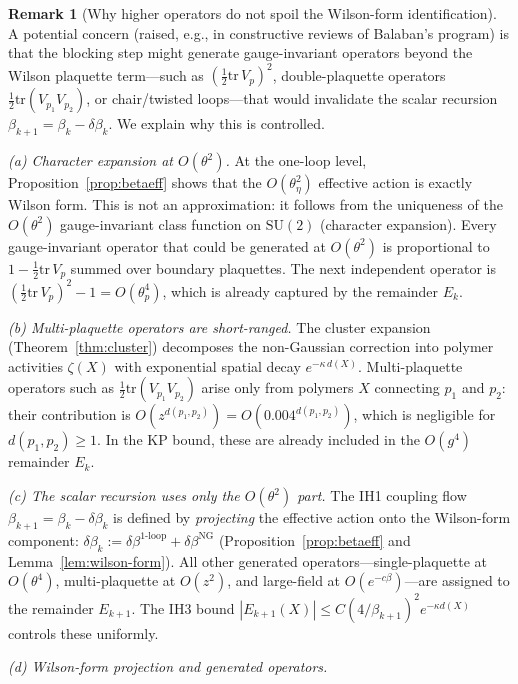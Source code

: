 \documentclass[11pt]{article}
\theoremstyle{definition}
\newtheorem{remark}[theorem]{Remark}
\newcommand{\SU}{\mathrm{SU}}
\newcommand{\tr}{\mathrm{tr}}
\begin{document}
\begin{remark}[Why higher operators do not spoil the Wilson-form identification]%
\label{rem:operator-classification}
A potential concern (raised, e.g., in constructive reviews of
Balaban's program) is that the blocking step might generate
gauge-invariant operators beyond the Wilson plaquette term---such as
$(\frac{1}{2}\tr\,V_p)^2$, double-plaquette operators
$\frac{1}{2}\tr(V_{p_1}V_{p_2})$, or chair/twisted loops---that would
invalidate the scalar recursion $\beta_{k+1}=\beta_k-\delta\beta_k$.
We explain why this is controlled.

\emph{(a) Character expansion at $O(\theta^2)$.}
At the one-loop level, Proposition~\ref{prop:betaeff} shows that
the $O(\theta_\eta^2)$ effective action is exactly Wilson
form.  This is not an approximation: it follows from the uniqueness
of the $O(\theta^2)$ gauge-invariant class function on $\SU(2)$
(character expansion).  Every gauge-invariant operator that could be
generated at $O(\theta^2)$ is proportional to $1-\frac{1}{2}\tr\,V_p$
summed over boundary plaquettes.  The next independent operator
is $(\frac{1}{2}\tr\,V_p)^2-1=O(\theta_p^4)$, which is already
captured by the remainder $E_k$.

\emph{(b) Multi-plaquette operators are short-ranged.}
The cluster expansion (Theorem~\ref{thm:cluster}) decomposes the
non-Gaussian correction into polymer activities $\zeta(X)$ with
exponential spatial decay $e^{-\kappa\,d(X)}$.  Multi-plaquette
operators such as $\frac{1}{2}\tr(V_{p_1}V_{p_2})$ arise only from
polymers $X$ connecting $p_1$ and $p_2$: their contribution is
$O(z^{d(p_1,p_2)})=O(0.004^{d(p_1,p_2)})$, which is negligible
for $d(p_1,p_2)\ge 1$.  In the KP bound, these are already
included in the $O(g^4)$ remainder $E_k$.

\emph{(c) The scalar recursion uses only the $O(\theta^2)$ part.}
The IH1 coupling flow $\beta_{k+1}=\beta_k-\delta\beta_k$ is defined
by \emph{projecting} the effective action onto the Wilson-form
component:
$\delta\beta_k:=\delta\beta^{1\text{-loop}}
+\delta\beta^{\mathrm{NG}}$
(Proposition~\ref{prop:betaeff} and Lemma~\ref{lem:wilson-form}).
All other generated operators---single-plaquette at
$O(\theta^4)$, multi-plaquette at $O(z^2)$, and
large-field at $O(e^{-c\beta})$---are assigned to the remainder
$E_{k+1}$.  The IH3 bound $|E_{k+1}(X)|\le C(4/\beta_{k+1})^2
e^{-\kappa d(X)}$ controls these uniformly.

\emph{(d) Wilson-form projection and generated operators.}


\end{remark}
\end{document}
